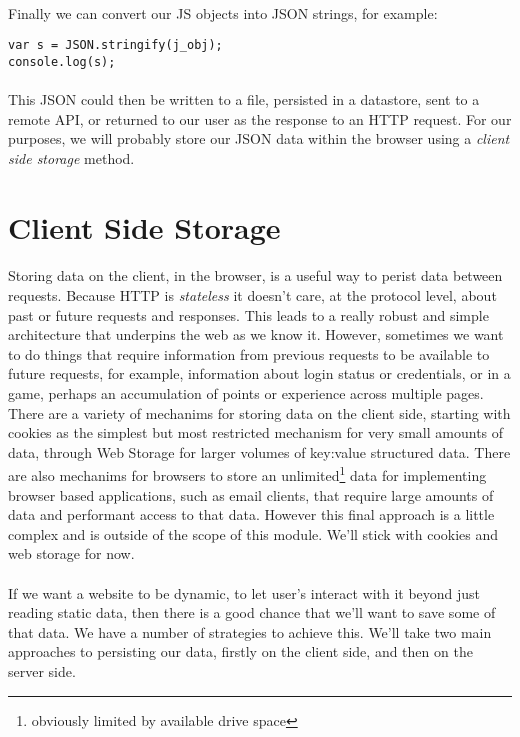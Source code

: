 \documentclass[10pt, a4paper, twosize]{article}
\begin{document}
\paragraph{} Finally we can convert our JS objects into JSON strings, for example:

\begin{lstlisting}
var s = JSON.stringify(j_obj);
console.log(s);
\end{lstlisting}

\paragraph{} This JSON could then be written to a file, persisted in a datastore, sent to a remote API, or returned to our user as the response to an HTTP request. For our purposes, we will probably store our JSON data within the browser using a \emph{client side storage} method.

\section{Client Side Storage}
\paragraph{} Storing data on the client, in the browser, is a useful way to perist data between requests. Because HTTP is \emph{stateless} it doesn't care, at the protocol level, about past or future requests and responses. This leads to a really robust and simple architecture that underpins the web as we know it. However, sometimes we want to do things that require information from previous requests to be available to future requests, for example, information about login status or credentials, or in a game, perhaps an accumulation of points or experience across multiple pages. There are a variety of mechanims for storing data on the client side, starting with cookies as the simplest but most restricted mechanism for very small amounts of data, through Web Storage for larger volumes of key:value structured data. There are also mechanims for browsers to store an unlimited\footnote{obviously limited by available drive space} data for implementing browser based applications, such as email clients, that require large amounts of data and performant access to that data. However this final approach is a little complex and is outside of the scope of this module. We'll stick with cookies and web storage for now.

\paragraph{} If we want a website to be dynamic, to let user's interact with it beyond just reading static data, then there is a good chance that we'll want to save some of that data. We have a number of strategies to achieve this. We'll take two main approaches to persisting our data, firstly on the client side, and then on the server side. 
\end{document}
